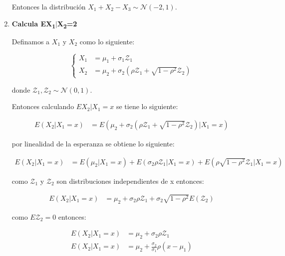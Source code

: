 \begin{enumerate}
          Entonces la distribución $X_1+X_2-X_3 \sim \mathcal{N}(-2,1)$.

    \item \textbf{Calcula EX\textsubscript{1}$|$X\textsubscript{2}=2}

          Definamos a $X_1$ y $X_2$ como lo siguiente:

          \begin{equation*}
              \begin{cases}
                  X_1 & = \mu_1 + \sigma_1 \mathcal{Z}_1                                                      \\
                  X_2 & = \mu_2 + \sigma_2 \left ( \rho \mathcal{Z}_1  + \sqrt{1-\rho^2}\mathcal{Z}_2\right )
              \end{cases}
          \end{equation*}

          donde $\mathcal{Z}_1 , \mathcal{Z}_2 \sim \mathcal{N}(0,1)$.

          Entonces calculando $EX_2|X_1=x$ se tiene lo siguiente:

          \begin{align*}
              E(X_2 | X_1=x) & = E(\mu_2 + \sigma_2 \left ( \rho \mathcal{Z}_1  + \sqrt{1-\rho^2}\mathcal{Z}_2\right )|X_1=x)
          \end{align*}

          por linealidad de la esperanza se obtiene lo siguiente:

          \begin{align*}
              E(X_2 | X_1=x) & =E(\mu_2|X_1=x) + E(\sigma_2 \rho \mathcal{Z}_1|X_1=x) + E(\rho \sqrt{1-\rho^2}\mathcal{Z}_1|X_1=x)
          \end{align*}

          como $\mathcal{Z}_1$ y $\mathcal{Z}_2$ son distribuciones independientes de x entonces:

          \begin{align*}
              E(X_2 | X_1=x) & =\mu_2 + \sigma_2 \rho \mathcal{Z}_1 + \sigma_2 \sqrt{1-\rho^2}E(\mathcal{Z}_2)
          \end{align*}

          como $E\mathcal{Z}_2=0$ entonces:

          \begin{align*}
              E(X_2 | X_1=x) & =\mu_2 + \sigma_2 \rho \mathcal{Z}_1               \\
              E(X_2 | X_1=x) & = \mu_2 + \frac{\sigma_2}{\sigma_1} \rho (x-\mu_1)
          \end{align*}


\end{enumerate}
